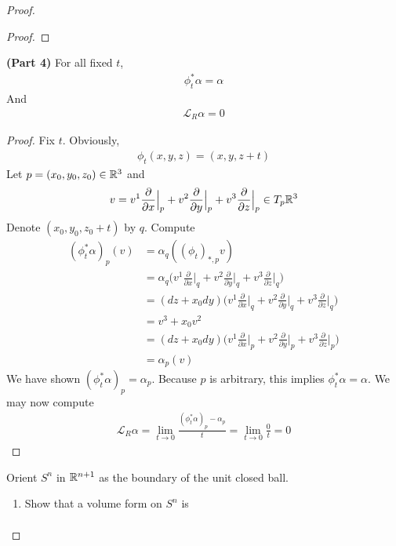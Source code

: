 \documentclass{report}
\begin{document}
\begin{proof}
\begin{proof}
\end{proof}
\begin{theorem}
\textbf{(Part 4)} For all fixed $t$, 
\begin{align*}
\phi_t^* \alpha = \alpha 
\end{align*}
And 
\begin{align*}
\mathcal{L}_R \alpha =0
\end{align*}
\end{theorem}
\begin{proof}
Fix $t$. Obviously,  
\begin{align*}
\phi_t (x,y,z)= (x,y,z+t)
\end{align*}
Let $p=(x_0,y_0,z_0)\in\mathbb{R}^3$ and 
\begin{align*}
v= v^1\frac{\partial }{\partial x}\Big|_{p}+ v^2\frac{\partial }{\partial y}\Big|_{p}+v^3 \frac{\partial }{\partial z}\Big|_{p} \in T_p\mathbb{R}^3
\end{align*}
Denote $(x_0,y_0,z_0+t)$ by $q$.  Compute  
\begin{align*}
  (\phi_t^*\alpha )_{p}(v)&=\alpha_{q}((\phi_t)_{*,p}v)  \\
  &=\alpha_{q} \Big( v^1\frac{\partial }{\partial x}\Big|_{q}+ v^2\frac{\partial }{\partial y}\Big|_{q}+v^3 \frac{\partial }{\partial z}\Big|_{q} \Big) \\
  &= (dz+x_0dy) \Big( v^1\frac{\partial }{\partial x}\Big|_{q}+ v^2\frac{\partial }{\partial y}\Big|_{q}+v^3 \frac{\partial }{\partial z}\Big|_{q} \Big)  \\
  &= v^3 + x_0v^2\\
  &=(dz+x_0dy)\Big( v^1\frac{\partial }{\partial x}\Big|_{p}+ v^2\frac{\partial }{\partial y}\Big|_{p}+v^3 \frac{\partial }{\partial z}\Big|_{p}  \Big) \\
  &=\alpha_p (v)
\end{align*}
We have shown $(\phi_t^* \alpha )_p=\alpha _p$. Because $p$ is arbitrary, this implies  $\phi_t^*\alpha =\alpha $. We may now compute 
\begin{align*}
\mathcal{L}_R \alpha =\lim_{t\to 0} \frac{(\phi_t^*\alpha )_p-\alpha_p}{t}= \lim_{t\to 0} \frac{0}{t}=0
\end{align*}
\end{proof}
\begin{question}{}{}
Orient $S^n$ in  $\mathbb{R}^{n+1}$ as the boundary of the unit closed ball. 
\begin{enumerate}[label=(\alph*)]
  \item Show that a volume form on $S^n$ is 
     \begin{align*}

\end{align*}
\end{enumerate}
\end{question}
\end{proof}
\end{document}
